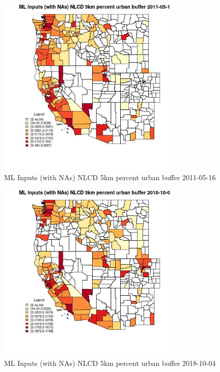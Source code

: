 \begin{figure} 
\centering  
\includegraphics[width=0.77\textwidth]{Code_Outputs/Report_ML_input_PM25_Step4_part_f_de_duplicated_aves_prioritize_24hr_obswNAs_CountyNLCD_5km_percent_urban_bufferMean2011-05-16.jpg} 
\caption{\label{fig:Report_ML_input_PM25_Step4_part_f_de_duplicated_aves_prioritize_24hr_obswNAsCountyNLCD_5km_percent_urban_bufferMean2011-05-16}ML Inputs (with NAs) NLCD 5km percent urban buffer 2011-05-16} 
\end{figure} 
 

\clearpage 

\begin{figure} 
\centering  
\includegraphics[width=0.77\textwidth]{Code_Outputs/Report_ML_input_PM25_Step4_part_f_de_duplicated_aves_prioritize_24hr_obswNAs_CountyNLCD_5km_percent_urban_bufferMean2018-10-04.jpg} 
\caption{\label{fig:Report_ML_input_PM25_Step4_part_f_de_duplicated_aves_prioritize_24hr_obswNAsCountyNLCD_5km_percent_urban_bufferMean2018-10-04}ML Inputs (with NAs) NLCD 5km percent urban buffer 2018-10-04} 
\end{figure} 
 

